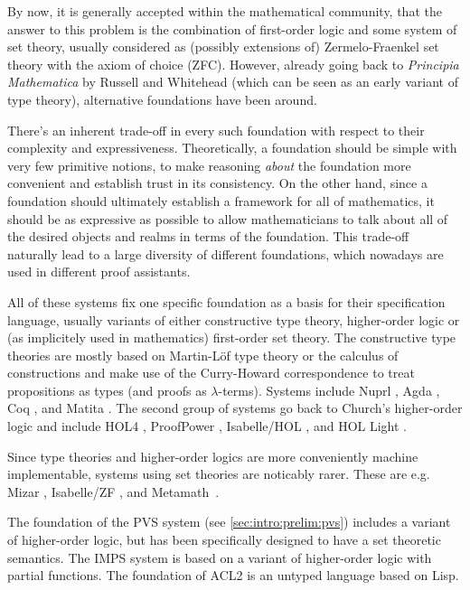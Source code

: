 By now, it is generally accepted within the mathematical community, that the answer to this problem is the combination of first-order logic and some system of set theory, usually considered as (possibly extensions of) Zermelo-Fraenkel set theory with the axiom of choice (ZFC). However, already going back to \emph{Principia Mathematica} by Russell and Whitehead (which can be seen as an early variant of type theory), alternative foundations have been around. \medskip

There's an inherent trade-off in every such foundation with respect to their complexity and expressiveness. Theoretically, a foundation should be simple with very few primitive notions, to make reasoning \emph{about} the foundation more convenient and establish trust in its consistency. On the other hand, since a foundation should ultimately establish a framework for all of mathematics, it should be as expressive as possible to allow mathematicians to talk about all of the desired objects and realms in terms of the foundation. This trade-off naturally lead to a large diversity of different foundations, which nowadays are used in different proof assistants.

All of these systems fix one specific foundation as a basis for their specification language, usually variants of either constructive type theory, higher-order logic or (as implicitely used in mathematics) first-order set theory.  The constructive type theories are mostly based on Martin-L\"of
type theory \cite{martinlof} or the calculus of constructions \cite{calcconstructions} and
make use of the Curry-Howard correspondence \cite{curry,howard} to treat propositions as
types (and proofs as $\lambda$-terms).  Systems include Nuprl \cite{nuprl}, Agda
\cite{agda}, Coq \cite{coqmanual}, and Matita \cite{matita}.  The second group of systems
go back to Church's higher-order logic \cite{churchtypes} and include HOL4 \cite{HOL4:on}, ProofPower \cite{proofpower}, Isabelle/HOL
\cite{isabellehol}, and HOL Light \cite{hollight}. \medskip

Since type theories and higher-order logics are more conveniently machine implementable, systems using set theories are noticably rarer. These are e.g. Mizar \cite{mizar},
Isabelle/ZF \cite{isabelle_zf}, and Metamath~\cite{MetaMath:on}.

The foundation of the PVS system (see \autoref{sec:intro:prelim:pvs}) includes a variant of higher-order logic, but has been specifically designed to have a set theoretic semantics. The IMPS system \cite{imps} is based on a
variant of higher-order logic with partial functions.  The foundation of ACL2 \cite{acl2}
is an untyped language based on Lisp.

